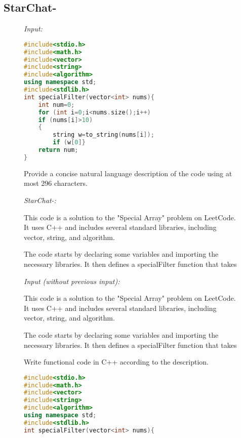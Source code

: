 \subsection{StarChat-\texorpdfstring{}{beta}}
\label{sec:examplesstarchatbeta}

\begin{figure}[htbp]
\hrulefill

\emph{Input:}

\hrulefill

\begin{lstlisting}[language=C++,breaklines=true,basicstyle=\ttfamily\scriptsize]
#include<stdio.h>
#include<math.h>
#include<vector>
#include<string>
#include<algorithm>
using namespace std;
#include<stdlib.h>
int specialFilter(vector<int> nums){
    int num=0;
    for (int i=0;i<nums.size();i++)
    if (nums[i]>10)
    {
        string w=to_string(nums[i]);
        if (w[0]}
    return num;
}
\end{lstlisting}

Provide a concise natural language description of the code using at most 296 characters.

\hrulefill

\emph{StarChat-:}

\hrulefill

This code is a solution to the "Special Array" problem on LeetCode. It uses C++ and includes several standard libraries, including vector, string, and algorithm.

The code starts by declaring some variables and importing the necessary libraries. It then defines a specialFilter function that takes


\hrulefill

\emph{Input (without previous input):}

\hrulefill

This code is a solution to the "Special Array" problem on LeetCode. It uses C++ and includes several standard libraries, including vector, string, and algorithm.

The code starts by declaring some variables and importing the necessary libraries. It then defines a specialFilter function that takes

Write functional code in C++ according to the description.
\begin{lstlisting}[language=C++,breaklines=true,basicstyle=\ttfamily\scriptsize]
#include<stdio.h>
#include<math.h>
#include<vector>
#include<string>
#include<algorithm>
using namespace std;
#include<stdlib.h>
int specialFilter(vector<int> nums){
\end{lstlisting}


\end{figure}
